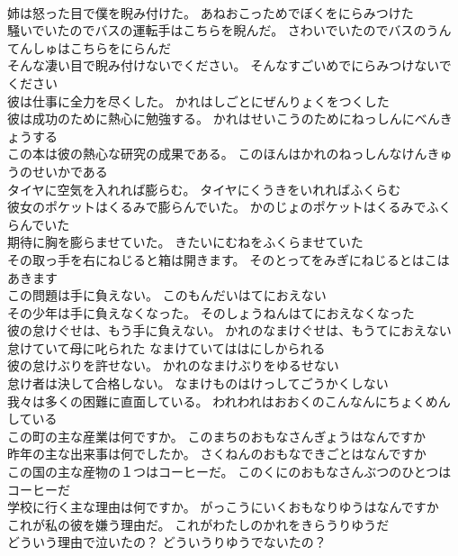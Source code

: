 \documentclass[8pt]{extreport}
\begin{document}
\begin{CJK}{UTF8}{min}
\\	姉は怒った目で僕を睨み付けた。	あねおこっためでぼくをにらみつけた 
\\	騒いでいたのでバスの運転手はこちらを睨んだ。	さわいでいたのでバスのうんてんしゅはこちらをにらんだ 
\\	そんな凄い目で睨み付けないでください。	そんなすごいめでにらみつけないでください 
\\	彼は仕事に全力を尽くした。	かれはしごとにぜんりょくをつくした 
\\	彼は成功のために熱心に勉強する。	かれはせいこうのためにねっしんにべんきょうする 
\\	この本は彼の熱心な研究の成果である。	このほんはかれのねっしんなけんきゅうのせいかである 
\\	タイヤに空気を入れれば膨らむ。	タイヤにくうきをいれればふくらむ 
\\	彼女のポケットはくるみで膨らんでいた。	かのじょのポケットはくるみでふくらんでいた 
\\	期待に胸を膨らませていた。	きたいにむねをふくらませていた 
\\	その取っ手を右にねじると箱は開きます。	そのとってをみぎにねじるとはこはあきます 
\\	この問題は手に負えない。	このもんだいはてにおえない 
\\	その少年は手に負えなくなった。	そのしょうねんはてにおえなくなった 
\\	彼の怠けぐせは、もう手に負えない。	かれのなまけぐせは、もうてにおえない 
\\	怠けていて母に叱られた	なまけていてははにしかられる 
\\	彼の怠けぶりを許せない。	かれのなまけぶりをゆるせない 
\\	怠け者は決して合格しない。	なまけものはけっしてごうかくしない 
\\	我々は多くの困難に直面している。	われわれはおおくのこんなんにちょくめんしている 
\\	この町の主な産業は何ですか。	このまちのおもなさんぎょうはなんですか 
\\	昨年の主な出来事は何でしたか。	さくねんのおもなできごとはなんですか 
\\	この国の主な産物の１つはコーヒーだ。	このくにのおもなさんぶつのひとつはコーヒーだ 
\\	学校に行く主な理由は何ですか。	がっこうにいくおもなりゆうはなんですか 
\\	これが私の彼を嫌う理由だ。	これがわたしのかれをきらうりゆうだ 
\\	どういう理由で泣いたの？	どういうりゆうでないたの？ 

\end{CJK}
\end{document}
